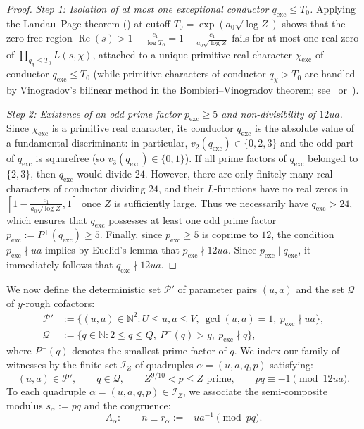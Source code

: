 \documentclass[11pt, a4paper]{article}
\theoremstyle{plain}
\theoremstyle{definition}
\newcommand{\N}{\mathbb{N}}
\begin{document}
\begin{proof}
\emph{Step 1: Isolation of at most one exceptional conductor $q_{\mathrm{exc}} \le T_0$.}
Applying the Landau--Page theorem (\cite[Chap.~14]{davenport}) at cutoff $T_0 = \exp(a_0\sqrt{\log Z})$ shows that the zero-free region $\operatorname{Re}(s) > 1 - \frac{c_1}{\log T_0} = 1 - \frac{c_1}{a_0\sqrt{\log Z}}$ fails for at most one real zero of $\prod_{q_\chi \le T_0} L(s, \chi)$, attached to a unique primitive real character $\chi_{\mathrm{exc}}$ of conductor $q_{\mathrm{exc}} \le T_0$ (while primitive characters of conductor $q_\chi > T_0$ are handled by Vinogradov's bilinear method in the Bombieri--Vinogradov theorem; see~\cite[Chap.~28]{davenport} or~\cite[Prop.~9.2]{maynard2016}).

\medskip\noindent\emph{Step 2: Existence of an odd prime factor $p_{\mathrm{exc}} \ge 5$ and non-divisibility of $12ua$.}
Since $\chi_{\mathrm{exc}}$ is a primitive real character, its conductor $q_{\mathrm{exc}}$ is the absolute value of a fundamental discriminant: in particular, $v_2(q_{\mathrm{exc}}) \in \{0, 2, 3\}$ and the odd part of $q_{\mathrm{exc}}$ is squarefree (so $v_3(q_{\mathrm{exc}}) \in \{0, 1\}$). If all prime factors of $q_{\mathrm{exc}}$ belonged to $\{2, 3\}$, then $q_{\mathrm{exc}}$ would divide $24$. However, there are only finitely many real characters of conductor dividing $24$, and their $L$-functions have no real zeros in $[1 - \frac{c_1}{a_0\sqrt{\log Z}}, 1]$ once $Z$ is sufficiently large. Thus we necessarily have $q_{\mathrm{exc}} > 24$, which ensures that $q_{\mathrm{exc}}$ possesses at least one odd prime factor $p_{\mathrm{exc}} := P^+(q_{\mathrm{exc}}) \ge 5$. Finally, since $p_{\mathrm{exc}} \ge 5$ is coprime to $12$, the condition $p_{\mathrm{exc}} \nmid ua$ implies by Euclid's lemma that $p_{\mathrm{exc}} \nmid 12ua$. Since $p_{\mathrm{exc}} \mid q_{\mathrm{exc}}$, it immediately follows that $q_{\mathrm{exc}} \nmid 12ua$.
\end{proof}

We now define the deterministic set $\mathcal{P}'$ of parameter pairs $(u,a)$ and the set $\mathcal{Q}$ of $y$-rough cofactors:
\begin{align}
\mathcal{P}' &:= \big\{ (u,a) \in \N^2 : U \le u, a \le V,\ \gcd(u,a) = 1,\ p_{\mathrm{exc}} \nmid ua \big\}, \label{eq:def_P_prime_sec}\\
\mathcal{Q} &:= \big\{ q \in \N : 2 \le q \le Q,\ P^-(q) > y,\ p_{\mathrm{exc}} \nmid q \big\}, \label{eq:def_Q_sec}
\end{align}
where $P^-(q)$ denotes the smallest prime factor of $q$. We index our family of witnesses by the finite set $\mathcal{I}_Z$ of quadruples $\alpha = (u,a,q,p)$ satisfying:
\begin{equation}\label{eq:def_I_Z_sec}
(u,a) \in \mathcal{P}', \qquad q \in \mathcal{Q}, \qquad Z^{9/10} < p \le Z \text{ prime}, \qquad pq \equiv -1 \pmod{12ua}.
\end{equation}
To each quadruple $\alpha = (u,a,q,p) \in \mathcal{I}_Z$, we associate the semi-composite modulus $s_\alpha := pq$ and the congruence:
\begin{equation}\label{eq:congruence_A_alpha_sec}
A_\alpha : \qquad n \equiv r_\alpha := -u a^{-1} \pmod{pq}.
\end{equation}
\end{document}
